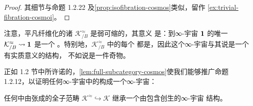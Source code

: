 \begin{proof}
其细节与命题 1.2.22 及\cref{prop:isofibration-cosmos}类似，留作%
\cref{ex:trivial-fibration-cosmoi}。
\end{proof}

注意，平凡纤维化的诸\trSliceInfinityCosmos{} $\mathcal{K}^{\approx}_{/B}$ 是弱可缩的，其意义
是：到\trTerminal{}∞-宇宙 $\mathbf{1}$ 的唯一\trFunctor{}
$\mathcal{K}^{\approx}_{/B}\rightsquigarrow\mathbf{1}$ 是一个%
\trCosmologicalBiequivalence。特别地，$\mathcal{K}^{\approx}_{/B}$ 中的每个%
\trFunctor{}都是\trEquivalence，因此这个∞-宇宙与其说是一个有实质意义的结构，
不如说是一件奇物。

正如 1.2 节中所许诺的，\cref{lem:full-subcategory-cosmos}使我们能够推广命题
1.2.12，以证明任何∞-宇宙中的\trDiscrete{}\trInfinityCategory{}构成一个∞-宇宙：

\begin{proposition}[离散∞-范畴的∞-宇宙]\label{prop:discrete-cosmos}
任何\trInfinityCosmos{}中由\trDiscrete{}\trInfinityCategory{}张成的全子范畴
$\mathcal{K}^{\approx}\hookrightarrow\mathcal{K}$ 继承一个由包含创生的∞-宇宙
结构。
\end{proposition}


